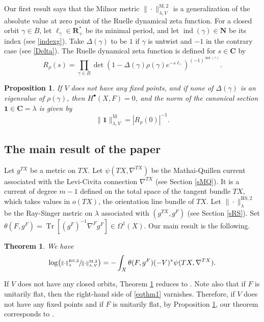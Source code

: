 \documentclass[JEP,XML,SOM,Unicode]{cedram}
\newcommand{\sbullet}{{\scriptscriptstyle\bullet}}
\newcommand{\rM}{\mathrm{M}}
\newcommand{\RS}{\mathrm{RS}}
\theoremstyle{plain}
\newtheorem{thm}[lem]{Theorem}
\newtheorem{prop}[lem]{Proposition}
\theoremstyle{definition}
\theoremstyle{remark}
\newcommand{\bN}{\mathbf{N}}
\newcommand{\bR}{\mathbf{R}}
\newcommand{\bC}{\mathbf{C}}
\DeclareMathOperator{\ind}{ind}
\DeclareMathOperator{\Tr}{Tr}
\begin{document}
Our first result says that the Milnor metric
$\|{\cdot}\|^{\rM,2}_{\lambda, V}$ is a generalization of the absolute value at
zero point of
the Ruelle dynamical zeta function. For a closed orbit $\gamma\in B$,
let $\ell_{\gamma}\in \bR^{*}_{+}$ be its minimal period, and let
$\ind(\gamma)\in \bN$ be its index
(see \eqref{indexg}). Take $\Delta(\gamma)$ to be $1$ if
$\gamma$ is untwist and $-1$ in the contrary case (see \eqref{Delta}). The Ruelle dynamical zeta function
is defined for $s\in \bC$ by
\begin{equation*}\label{intoR}
R_{\rho}(s)=\prod_{\gamma\in
B}\det(1-\Delta(\gamma)\rho(\gamma)e^{-s
\ell_\gamma})^{(-1)^{\ind(\gamma)}}.
\end{equation*}

\begin{prop}\label{prop}
If $V$ does not have any fixed points, and if none of $\Delta(\gamma)$ is an eigenvalue of $\rho(\gamma)$, then
$H^{\sbullet}(X,F)=0$, and the norm of the canonical section
$\mathbf{1}\in \bC=\lambda$ is given by
\begin{equation*}
\|\mathbf{1}\|^{\rM}_{\lambda,V}=|R_{\rho}(0)|^{-1}.
\end{equation*}
\end{prop}

\subsection{The main result of the paper}
Let $g^{TX}$ be a metric on $TX$. Let
$\psi(TX,\nabla^{TX})$ be the Mathai-Quillen current associated with the
Levi-Civita connection $\nabla^{TX}$ (see Section \ref{sMQ}). It is a
current of degree $m-1$ defined
on the total space of the tangent bundle $TX$, which takes values in
$o(TX)$, the orientation line bundle of $TX$. Let $\|{\cdot}\|^{\RS,2}_{\lambda}$ be the Ray-Singer metric
on $\lambda$ associated with $(g^{TX},g^{F})$ (see Section \ref{sRS}).
Set $
\theta(F,g^{F})=\Tr[(g^{F})^{-1}\nabla^{F}g^{F}]\in \Omega^{1}(X)$.
Our main result is the following.

\begin{thm}\label{thm1} We have
\begin{equation}\label{eqthm1}
\log
\bigl(\sfrac{\|{\cdot}\|^{\RS,2}_{\lambda}}{\|{\cdot}\|^{\rM,2}_{\lambda,V}}\bigr)=-\int_{X}\theta(F,g^{F})(-V)^{*}\psi(TX,\nabla^{TX}).
\end{equation}
\end{thm}

If $V$ does not have any closed orbits, Theorem \ref{thm1} reduces to
\cite[Th.\,0.2]{BZ92}. Note also that if $F$ is unitarily flat, then the right-hand side of
\eqref{eqthm1} varnishes. Therefore, if $V$ does not have any fixed
points and if $F$ is unitarily flat, by Proposition \ref{prop}, our theorem corresponds to \cite[Th.\,3.1]{Friedconj}.
\end{document}
